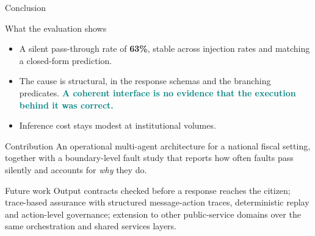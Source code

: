 \documentclass[aspectratio=169,10pt]{beamer}
\newcommand{\hl}[1]{\textcolor{teal}{\textbf{#1}}}      %
\newcommand{\risk}[1]{\textcolor{rust}{\textbf{#1}}}    %
\begin{document}
\begin{frame}{Conclusion}
  \begin{block}{What the evaluation shows}
    \begin{itemize}\small
      \item A silent pass-through rate of \risk{63\%}, stable across injection rates and
        matching a closed-form prediction.
      \item The cause is structural, in the response schemas and the branching predicates.
        \hl{A coherent interface is no evidence that the execution behind it was correct.}
      \item Inference cost stays modest at institutional volumes.
    \end{itemize}
  \end{block}
  \begin{block}{Contribution}
    \small An operational multi-agent architecture for a national fiscal setting, together with
    a boundary-level fault study that reports how often faults pass silently and accounts for
    \emph{why} they do.
  \end{block}
  \begin{block}{Future work}
    \small Output contracts checked before a response reaches the citizen; trace-based
    assurance with structured message-action traces, deterministic replay and action-level
    governance; extension to other public-service domains over the same orchestration and
    shared services layers.
  \end{block}
\end{frame}
\end{document}
